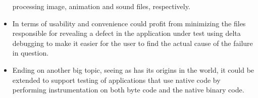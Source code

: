 \begin{itemize}
processing image, animation and sound files, respectively.
\item[]In terms of usability and convenience \xmlmate could profit from minimizing the files responsible for
revealing a defect in the application under test using delta debugging\cite{zeller2002simplifying} to make it
easier for the user to find the actual cause of the failure in question.
\item[]Ending on another big topic, seeing as \xmlmate has its origins in the \java world, it could be extended
to support testing of \java applications that use native code by performing instrumentation on both \java
byte code and the native binary code.
\end{itemize}

